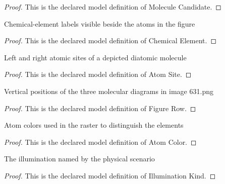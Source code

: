 \begin{proof}
  This is the declared model definition of Molecule Candidate.
\end{proof}
\begin{definition}
  \label{def:physics:phyx-mini-0631:phyxminiproblems-problemphyxmini0631-chemicalelement}
  Chemical-element labels visible beside the atoms in the figure
\end{definition}
\begin{proof}
  This is the declared model definition of Chemical Element.
\end{proof}
\begin{definition}
  \label{def:physics:phyx-mini-0631:phyxminiproblems-problemphyxmini0631-atomsite}
  Left and right atomic sites of a depicted diatomic molecule
\end{definition}
\begin{proof}
  This is the declared model definition of Atom Site.
\end{proof}
\begin{definition}
  \label{def:physics:phyx-mini-0631:phyxminiproblems-problemphyxmini0631-figurerow}
  Vertical positions of the three molecular diagrams in image 631.png
\end{definition}
\begin{proof}
  This is the declared model definition of Figure Row.
\end{proof}
\begin{definition}
  \label{def:physics:phyx-mini-0631:phyxminiproblems-problemphyxmini0631-atomcolor}
  Atom colors used in the raster to distinguish the elements
\end{definition}
\begin{proof}
  This is the declared model definition of Atom Color.
\end{proof}
\begin{definition}
  \label{def:physics:phyx-mini-0631:phyxminiproblems-problemphyxmini0631-illuminationkind}
  The illumination named by the physical scenario
\end{definition}
\begin{proof}
  This is the declared model definition of Illumination Kind.
\end{proof}
